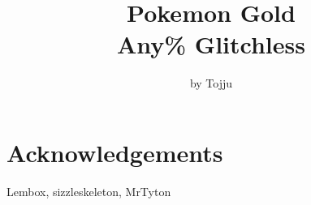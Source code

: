 \documentclass[a4paper]{report}
\title{\textbf{\Huge{Pokemon Gold \\ 
  Any\% Glitchless}}}
\author{\LARGE{by Tojju}}
\date{\vspace{-5ex}}
\begin{document}
\singlespacing
\maketitle
\tableofcontents
{}

\section*{Acknowledgements}
Lembox, sizzleskeleton, MrTyton























\end{document}
